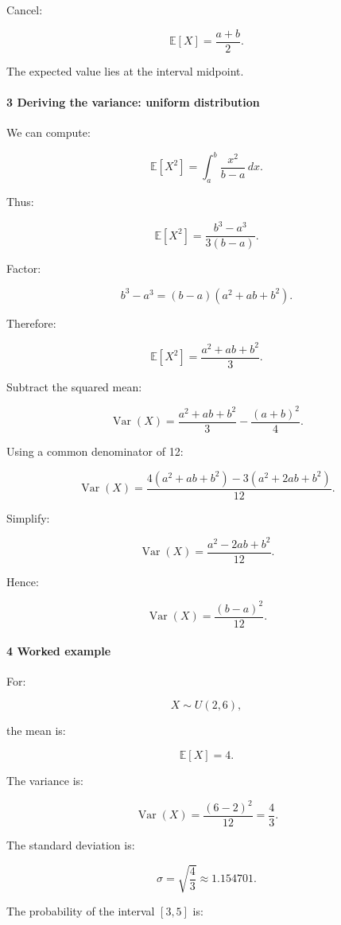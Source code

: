 Cancel:

\[
 \boxed{ \mathbb E[X]=\frac{a+b}{2} }.
\]

The expected value lies at the interval midpoint.

\paragraph{3 Deriving the variance: uniform distribution}\label{deriving-the-variance-uniform-distribution}

We can compute:

\[
 \mathbb E[X^2] = \int_a^b\frac{x^2}{b-a}\,dx.
\]

Thus:

\[
 \mathbb E[X^2] = \frac{b^3-a^3}{3(b-a)}.
\]

Factor:

\[
 b^3-a^3=(b-a)(a^2+ab+b^2).
\]

Therefore:

\[
 \mathbb E[X^2] = \frac{a^2+ab+b^2}{3}.
\]

Subtract the squared mean:

\[
 \operatorname{Var}(X) = \frac{a^2+ab+b^2}{3} -\frac{(a+b)^2}{4}.
\]

Using a common denominator of 12:

\[
 \operatorname{Var}(X) = \frac{ 4(a^2+ab+b^2)-3(a^2+2ab+b^2) }{12}.
\]

Simplify:

\[
 \operatorname{Var}(X) = \frac{a^2-2ab+b^2}{12}.
\]

Hence:

\[
 \boxed{ \operatorname{Var}(X)=\frac{(b-a)^2}{12} }.
\]

\paragraph{4 Worked example}\label{worked-example-1}

For:

\[
 X\sim U(2,6),
\]

the mean is:

\[
 \mathbb E[X]=4.
\]

The variance is:

\[
 \operatorname{Var}(X) = \frac{(6-2)^2}{12} = \boxed{\frac43}.
\]

The standard deviation is:

\[
 \sigma=\sqrt{\frac43}\approx1.154701.
\]

The probability of the interval \([3,5]\) is:

